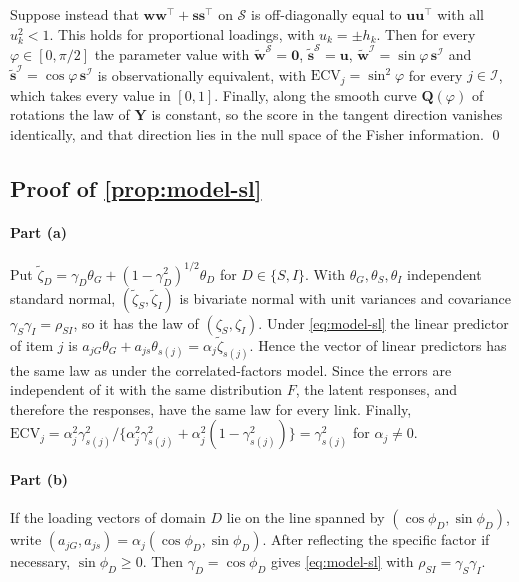 Suppose instead that $\bm w\bm w^\top+\bm s\bm s^\top$ on $\mathcal S$ is off-diagonally equal to $\bm u\bm u^\top$ with all $u_k^2<1$. This holds for proportional loadings, with $u_k=\pm h_k$. Then for every $\varphi\in[0,\pi/2]$ the parameter value with $\tilde{\bm w}^{\mathcal S}=\bm0$, $\tilde{\bm s}^{\mathcal S}=\bm u$, $\tilde{\bm w}^{\mathcal I}=\sin\varphi\,\bm s^{\mathcal I}$ and $\tilde{\bm s}^{\mathcal I}=\cos\varphi\,\bm s^{\mathcal I}$ is observationally equivalent, with $\mathrm{ECV}_j=\sin^2\varphi$ for every $j\in\mathcal I$, which takes every value in $[0,1]$. Finally, along the smooth curve $\bm Q(\varphi)$ of rotations the law of $\bm Y$ is constant, so the score in the tangent direction vanishes identically, and that direction lies in the null space of the Fisher information. \qed

\subsection{Proof of \texorpdfstring{\cref{prop:model-sl}}{the Schmid--Leiman proposition}}\label{app:pm-sl}

\paragraph{Part (a)}
Put $\tilde\zeta_D=\gamma_D\theta_G+(1-\gamma_D^2)^{1/2}\theta_D$ for $D\in\{S,I\}$. With $\theta_G,\theta_S,\theta_I$ independent standard normal, $(\tilde\zeta_S,\tilde\zeta_I)$ is bivariate normal with unit variances and covariance $\gamma_S\gamma_I=\rho_{SI}$, so it has the law of $(\zeta_S,\zeta_I)$. Under \eqref{eq:model-sl} the linear predictor of item $j$ is $a_{jG}\theta_G+a_{js}\theta_{s(j)}=\alpha_j\tilde\zeta_{s(j)}$. Hence the vector of linear predictors has the same law as under the correlated-factors model. Since the errors are independent of it with the same distribution $F$, the latent responses, and therefore the responses, have the same law for every link. Finally, $\mathrm{ECV}_j=\alpha_j^2\gamma_{s(j)}^2/\{\alpha_j^2\gamma_{s(j)}^2+\alpha_j^2(1-\gamma_{s(j)}^2)\}=\gamma_{s(j)}^2$ for $\alpha_j\neq0$.

\paragraph{Part (b)}
If the loading vectors of domain $D$ lie on the line spanned by $(\cos\phi_D,\sin\phi_D)$, write $(a_{jG},a_{js})=\alpha_j(\cos\phi_D,\sin\phi_D)$. After reflecting the specific factor if necessary, $\sin\phi_D\ge0$. Then $\gamma_D=\cos\phi_D$ gives \eqref{eq:model-sl} with $\rho_{SI}=\gamma_S\gamma_I$.

